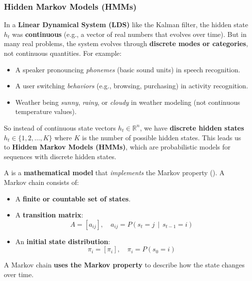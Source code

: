 \subsubsection{Hidden Markov Models (HMMs)}\label{sec:hidden-markov-models}

In a \textbf{Linear Dynamical System (LDS)} like the Kalman filter, the hidden state $h_t$ was \textbf{continuous} (e.g., a vector of real numbers that evolves over time). But in many real problems, the system evolves through \textbf{discrete modes or categories}, not continuous quantities. For example:
\begin{itemize}
    \item A speaker pronouncing \emph{phonemes} (basic sound units) in speech recognition.
    \item A user switching \emph{behaviors} (e.g., browsing, purchasing) in activity recognition.
    \item Weather being \emph{sunny}, \emph{rainy}, or \emph{cloudy} in weather modeling (not continuous temperature values).
\end{itemize}
So instead of continuous state vectors $h_t \in \mathbb{R}^n$, we have \textbf{discrete hidden states} $h_t \in \{1, 2, \ldots, K\}$ where $K$ is the number of possible hidden states. This leads us to \textbf{Hidden Markov Models (HMMs)}, which are probabilistic models for sequences with discrete hidden states.

\begin{definitionbox}\label{def:markov-chain}
    A  is a \textbf{mathematical model} that \emph{implements} the Markov property (). A Markov chain consists of:
    \begin{itemize}
        \item A \textbf{finite or countable set of states}.
        \item A \textbf{transition matrix}:
        \begin{equation*}
            A = \left[a_{ij}\right], \quad a_{ij} = P\left(s_{t} = j \, \mid \, s_{t-1} = i\right)
        \end{equation*}
        \item An \textbf{initial state distribution}:
        \begin{equation*}
            \pi_{i} = \left[\pi_i\right], \quad \pi_i = P\left(s_0 = i\right)
        \end{equation*}
    \end{itemize}
    A Markov chain \textbf{uses the Markov property} to describe how the state changes over time.
\end{definitionbox}

